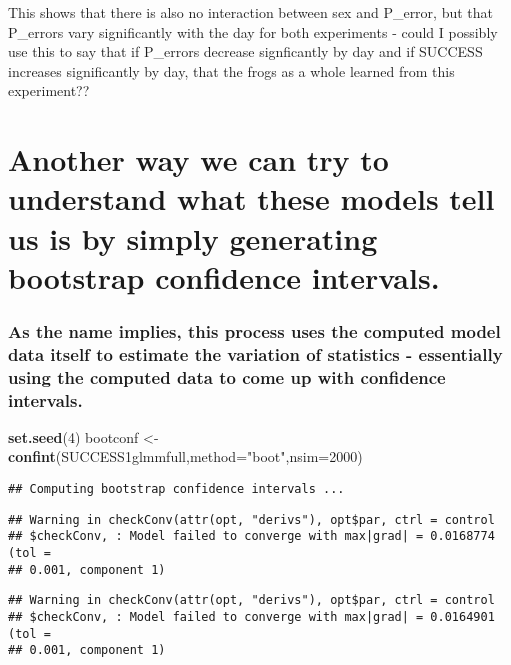 \documentclass[]{article}
\newenvironment{Shaded}{\begin{snugshade}}{\end{snugshade}}
\newcommand{\KeywordTok}[1]{\textcolor[rgb]{0.13,0.29,0.53}{\textbf{#1}}}
\newcommand{\DataTypeTok}[1]{\textcolor[rgb]{0.13,0.29,0.53}{#1}}
\newcommand{\DecValTok}[1]{\textcolor[rgb]{0.00,0.00,0.81}{#1}}
\newcommand{\StringTok}[1]{\textcolor[rgb]{0.31,0.60,0.02}{#1}}
\newcommand{\NormalTok}[1]{#1}
\begin{document}
This shows that there is also no interaction between sex and P\_error,
but that P\_errors vary significantly with the day for both experiments
- could I possibly use this to say that if P\_errors decrease
signficantly by day and if SUCCESS increases significantly by day, that
the frogs as a whole learned from this experiment??

\section{Another way we can try to understand what these models tell us
is by simply generating bootstrap confidence
intervals.}\label{another-way-we-can-try-to-understand-what-these-models-tell-us-is-by-simply-generating-bootstrap-confidence-intervals.}

\subsubsection{As the name implies, this process uses the computed model
data itself to estimate the variation of statistics - essentially using
the computed data to come up with confidence
intervals.}\label{as-the-name-implies-this-process-uses-the-computed-model-data-itself-to-estimate-the-variation-of-statistics---essentially-using-the-computed-data-to-come-up-with-confidence-intervals.}

\begin{Shaded}
\begin{Highlighting}[]
\KeywordTok{set.seed}\NormalTok{(}\DecValTok{4}\NormalTok{)}
\NormalTok{bootconf <-}\StringTok{ }\KeywordTok{confint}\NormalTok{(SUCCESS1glmmfull,}\DataTypeTok{method=}\StringTok{"boot"}\NormalTok{,}\DataTypeTok{nsim=}\DecValTok{2000}\NormalTok{)}
\end{Highlighting}
\end{Shaded}

\begin{verbatim}
## Computing bootstrap confidence intervals ...
\end{verbatim}

\begin{verbatim}
## Warning in checkConv(attr(opt, "derivs"), opt$par, ctrl = control
## $checkConv, : Model failed to converge with max|grad| = 0.0168774 (tol =
## 0.001, component 1)
\end{verbatim}

\begin{verbatim}
## Warning in checkConv(attr(opt, "derivs"), opt$par, ctrl = control
## $checkConv, : Model failed to converge with max|grad| = 0.0164901 (tol =
## 0.001, component 1)
\end{verbatim}
\end{document}
